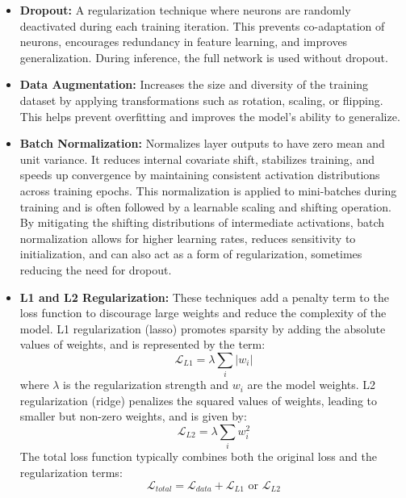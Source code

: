 \begin{itemize}
  \item \textbf{Dropout:} \autocite{10.5555/2627435.2670313} A regularization technique where neurons are randomly deactivated during each training iteration. This prevents co-adaptation of neurons, encourages redundancy in feature learning, and improves generalization. During inference, the full network is used without dropout.

  \item \textbf{Data Augmentation:} \autocite{10.1145/3510413} Increases the size and diversity of the training dataset by applying transformations such as rotation, scaling, or flipping. This helps prevent overfitting and improves the model's ability to generalize.

  \item \textbf{Batch Normalization:} \autocite{NEURIPS2018_36072923} \autocite{10.1145/3510413} Normalizes layer outputs to have zero mean and unit variance. It reduces internal covariate shift, stabilizes training, and speeds up convergence by maintaining consistent activation distributions across training epochs. This normalization is applied to mini-batches during training and is often followed by a learnable scaling and shifting operation. By mitigating the shifting distributions of intermediate activations, batch normalization allows for higher learning rates, reduces sensitivity to initialization, and can also act as a form of regularization, sometimes reducing the need for dropout.

  \item \textbf{L1 and L2 Regularization:} \autocite{kukačka2017regularizationdeeplearningtaxonomy} These techniques add a penalty term to the loss function to discourage large weights and reduce the complexity of the model. L1 regularization (lasso) promotes sparsity by adding the absolute values of weights, and is represented by the term:
    \[
      \mathcal{L}_{L1} = \lambda \sum_{i} |w_i|
    \]
    where \( \lambda \) is the regularization strength and \( w_i \) are the model weights. L2 regularization (ridge) penalizes the squared values of weights, leading to smaller but non-zero weights, and is given by:
    \[
      \mathcal{L}_{L2} = \lambda \sum_{i} w_i^2
    \]
    The total loss function typically combines both the original loss and the regularization terms:
    \[
      \mathcal{L}_{total} = \mathcal{L}_{data} + \mathcal{L}_{L1} \text{ or } \mathcal{L}_{L2}
    \]
\end{itemize}

